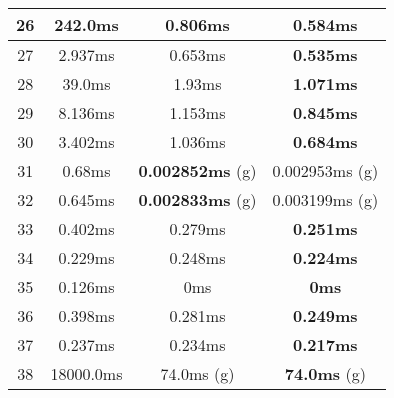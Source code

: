\begin{table}[H]
\begin{minipage}{5cm}
{\begin{tabular}{|c|c|c|c|}
\hline
26 & 242.0ms & 0.806ms & \textbf{0.584ms} \\
\hline
27 & 2.937ms & 0.653ms & \textbf{0.535ms} \\
\hline
28 & 39.0ms & 1.93ms & \textbf{1.071ms} \\
\hline
29 & 8.136ms & 1.153ms & \textbf{0.845ms} \\
\hline
30 & 3.402ms & 1.036ms & \textbf{0.684ms} \\
\hline
31 & 0.68ms & \textbf{0.002852ms} (g) & 0.002953ms (g) \\
\hline
32 & 0.645ms & \textbf{0.002833ms} (g) & 0.003199ms (g) \\
\hline
33 & 0.402ms & 0.279ms & \textbf{0.251ms} \\
\hline
34 & 0.229ms & 0.248ms & \textbf{0.224ms} \\
\hline
35 & 0.126ms & 0ms & \textbf{0ms} \\
\hline
36 & 0.398ms & 0.281ms & \textbf{0.249ms} \\
\hline
37 & 0.237ms & 0.234ms & \textbf{0.217ms} \\
\hline
38 & 18000.0ms & 74.0ms (g) & \textbf{74.0ms} (g) \\
\hline
\end{tabular}
}
\end{minipage}
\begin{minipage}{5cm} 
\end{minipage}
\end{table}
